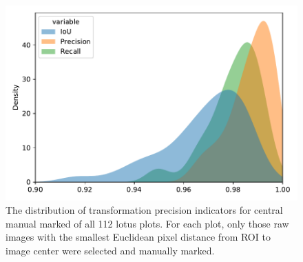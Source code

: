 \documentclass{configs/bmcart}
\begin{document}
\begin{backmatter}
\begin{figure}[!htb]
  \includegraphics[width=0.95\linewidth]{figures/iou_all.pdf}
  \caption{The distribution of transformation precision indicators for central manual marked of all 112 lotus plots. For each plot, only those raw images with the smallest Euclidean pixel distance from ROI to image center were selected and manually marked.}
  \label{fig:iou_all}
\end{figure}

\end{backmatter}
\end{document}
